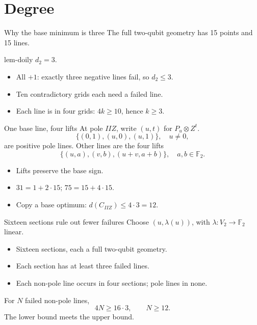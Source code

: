 \documentclass{beamer}
\begin{document}
\section{Degree}
\begin{frame}{Why the base minimum is three}
The full two-qubit geometry has 15 points and 15 lines.
\begin{bookresult}{lem-doily}
$d_2=3$.
\end{bookresult}
\begin{itemize}
\item All $+1$: exactly three negative lines fail, so $d_2\le3$.
\item Ten contradictory grids each need a failed line.
\item Each line is in four grids: $4k\ge10$, hence $k\ge3$.
\end{itemize}
\end{frame}
\begin{frame}{One base line, four lifts}
At pole $IIZ$, write $(u,t)$ for $P_u\otimes Z^t$.
\[
\{(0,1),(u,0),(u,1)\},\quad u\ne0,
\]
are positive pole lines. Other lines are the four lifts
\[
\{(u,a),(v,b),(u+v,a+b)\},\quad a,b\in\mathbb F_2.
\]
\begin{itemize}
\item Lifts preserve the base sign.
\item $31=1+2\cdot15$; $75=15+4\cdot15$.
\item Copy a base optimum: $d(C_{IIZ})\le4\cdot3=12$.
\end{itemize}
\end{frame}
\begin{frame}{Sixteen sections rule out fewer failures}
Choose $(u,\lambda(u))$, with $\lambda:V_2\to\mathbb F_2$ linear.
\begin{itemize}
\item Sixteen sections, each a full two-qubit geometry.
\item Each section has at least three failed lines.
\item Each non-pole line occurs in four sections; pole lines in none.
\end{itemize}
For $N$ failed non-pole lines,
\[4N\ge16\cdot3,\qquad N\ge12.\]
The lower bound meets the upper bound.
\end{frame}
\end{document}
